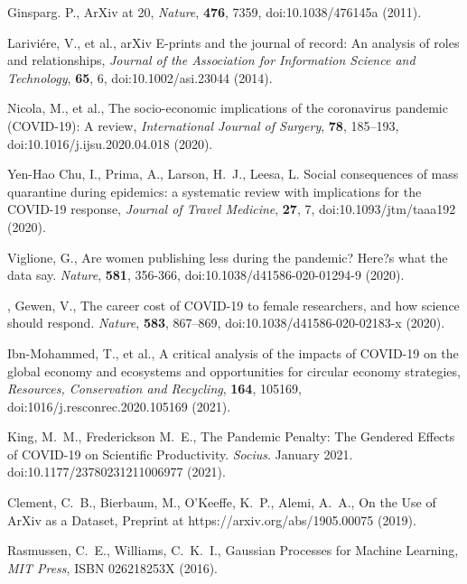 \documentclass[a4paper,12pt]{article}
\begin{document}
\begin{thebibliography}{10}

{Ginsparg}. P., {ArXiv at 20}, \emph{Nature}, \textbf{476}, 7359, doi:10.1038/476145a \newblock (2011).

{Larivi{\'e}re, V., et al.,} {arXiv E-prints and the journal of record: An analysis of roles and relationships}, \emph{Journal of the Association for Information Science and Technology}, \textbf{65}, 6, doi:10.1002/asi.23044 \newblock (2014).


{Nicola, M., et al.,} {The socio-economic implications of the coronavirus pandemic ({COVID}-19): A review}, \emph{International Journal of Surgery}, \textbf{78}, 185--193, doi:10.1016/j.ijsu.2020.04.018 \newblock (2020).

{Yen-Hao Chu, I., Prima, A., Larson, H.~J., Leesa, L.}
{Social consequences of mass quarantine during epidemics: a systematic review with implications for the {COVID}-19 response}, \emph{Journal of Travel Medicine}, \textbf{27}, 7, doi:10.1093/jtm/taaa192 \newblock (2020).


{Viglione, G.}, {Are women publishing less during the pandemic? Here?s what the data say}. \emph{Nature}, \textbf{581}, 356-366, doi:10.1038/d41586-020-01294-9 \newblock (2020).


,
{Gewen, V.}, {The career cost of COVID-19 to female researchers, and how science should respond}. \emph{Nature}, \textbf{583}, 867--869, doi:10.1038/d41586-020-02183-x \newblock (2020).


{Ibn-Mohammed, T., et al.,} {A critical analysis of the impacts of {COVID}-19 on the global economy and ecosystems and opportunities for circular economy strategies}, \emph{Resources, Conservation and Recycling}, \textbf{164}, 105169, doi:1016/j.resconrec.2020.105169 \newblock (2021).

{King, M.~M., Frederickson M.~E.}, {The Pandemic Penalty: The Gendered Effects of COVID-19 on Scientific Productivity}. \emph{Socius}. January 2021. doi:10.1177/23780231211006977 \newblock (2021).  


{Clement, C.~B., Bierbaum, M., O'Keeffe, K.~P., Alemi, A.~A.,}
{On the Use of ArXiv as a Dataset},
Preprint at https://arxiv.org/abs/1905.00075 \newblock (2019).

{Rasmussen, C.~E., Williams, C.~K.~I.,}
{Gaussian Processes for Machine Learning}, \emph{MIT Press}, ISBN 026218253X \newblock (2016).


\end{thebibliography}
\end{document}
